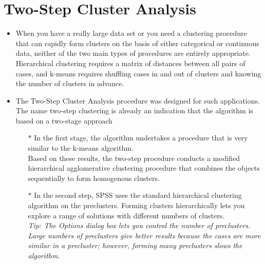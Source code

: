 \documentclass[a4paper,12pt]{article}
\begin{document}
\section{Two-Step Cluster Analysis}
\begin{itemize}
	\item 
	
	When you have a really large data set or you need a clustering procedure that can rapidly form clusters on the basis of either categorical or continuous data, neither of the two main types of procedures are entirely appropriate. Hierarchical clustering requires a matrix of distances between all pairs of cases, and k-means requires shuffling cases in and out of clusters and knowing the number of clusters in advance.
	
	\item The Two-Step Cluster Analysis procedure was designed for such applications. The name two-step clustering is already an indication that the algorithm is based on a two-stage approach
	\begin{itemize}
		\item[$\ast$] In the first stage, the algorithm undertakes a procedure that is very similar to the k-means algorithm. \\Based on these results, the two-step
		procedure conducts a modified hierarchical agglomerative clustering procedure that
		combines the objects sequentially to form homogenous clusters.

	\item[$\ast$] In the second step, SPSS uses the standard hierarchical clustering algorithm on the
	preclusters. Forming clusters hierarchically lets you explore a range of solutions with
	different numbers of clusters.
	\\ \textit{Tip: The Options dialog box lets you control the number of preclusters. Large numbers
	of preclusters give better results because the cases are more similar in a precluster;
	however, forming many preclusters slows the algorithm}.
	
\end{itemize}
\end{itemize}
\end{document}
